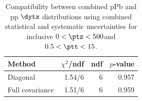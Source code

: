 \begin{table}[htp!]
\centering
\begin{tabular}{|l|r|r|r|}
\hline
Method & $\chi^2$/ndf & ndf & $p$-value \\
\hline
Diagonal & 1.54/6 & 6 & 0.957 \\
Full covariance & 1.51/6 & 6 & 0.959 \\
\hline
\end{tabular}
\caption{Compatibility between combined pPb and pp $\dytz$ distributions using combined statistical and systematic uncertainties for inclusive $0 < \ptz < 500$\GeV and $0.5 < \ptt < 15$\GeV.}
\label{table:chisq_deta}
\end{table}

